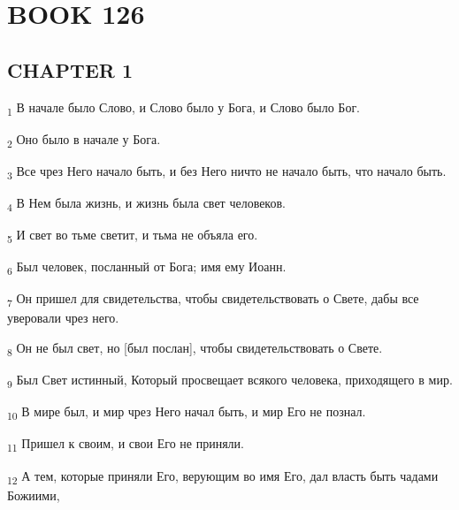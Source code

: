 \section{BOOK 126}
\subsection{CHAPTER 1}
\begin{tcolorbox}
\textsubscript{1} В начале было Слово, и Слово было у Бога, и Слово было Бог.
\end{tcolorbox}
\begin{tcolorbox}
\textsubscript{2} Оно было в начале у Бога.
\end{tcolorbox}
\begin{tcolorbox}
\textsubscript{3} Все чрез Него начало быть, и без Него ничто не начало быть, что начало быть.
\end{tcolorbox}
\begin{tcolorbox}
\textsubscript{4} В Нем была жизнь, и жизнь была свет человеков.
\end{tcolorbox}
\begin{tcolorbox}
\textsubscript{5} И свет во тьме светит, и тьма не объяла его.
\end{tcolorbox}
\begin{tcolorbox}
\textsubscript{6} Был человек, посланный от Бога; имя ему Иоанн.
\end{tcolorbox}
\begin{tcolorbox}
\textsubscript{7} Он пришел для свидетельства, чтобы свидетельствовать о Свете, дабы все уверовали чрез него.
\end{tcolorbox}
\begin{tcolorbox}
\textsubscript{8} Он не был свет, но [был послан], чтобы свидетельствовать о Свете.
\end{tcolorbox}
\begin{tcolorbox}
\textsubscript{9} Был Свет истинный, Который просвещает всякого человека, приходящего в мир.
\end{tcolorbox}
\begin{tcolorbox}
\textsubscript{10} В мире был, и мир чрез Него начал быть, и мир Его не познал.
\end{tcolorbox}
\begin{tcolorbox}
\textsubscript{11} Пришел к своим, и свои Его не приняли.
\end{tcolorbox}
\begin{tcolorbox}
\textsubscript{12} А тем, которые приняли Его, верующим во имя Его, дал власть быть чадами Божиими,
\end{tcolorbox}
